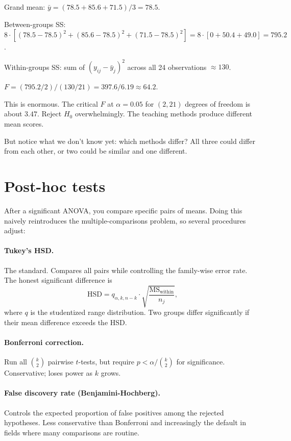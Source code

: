 Grand mean: $\bar y = (78.5 + 85.6 + 71.5)/3 = 78.5$.

Between-groups SS: $8 \cdot [(78.5 - 78.5)^2 + (85.6 - 78.5)^2 + (71.5 - 78.5)^2] = 8 \cdot [0 + 50.4 + 49.0] = 795.2$.

Within-groups SS: sum of $(y_{ij} - \bar y_j)^2$ across all 24 observations $\approx 130$.

$F = (795.2 / 2) / (130 / 21) = 397.6 / 6.19 \approx 64.2$.

This is enormous. The critical $F$ at $\alpha = 0.05$ for $(2, 21)$ degrees of freedom is about $3.47$. Reject $H_0$ overwhelmingly. The teaching methods produce different mean scores.

But notice what we don't know yet: which methods differ? All three could differ from each other, or two could be similar and one different.

\section{Post-hoc tests}

After a significant ANOVA, you compare specific pairs of means. Doing this naively reintroduces the multiple-comparisons problem, so several procedures adjust:

\paragraph{Tukey's HSD.} The standard. Compares all pairs while controlling the family-wise error rate. The honest significant difference is
\[
  \text{HSD} = q_{\alpha, k, n-k} \cdot \sqrt{\frac{\text{MS}_{\text{within}}}{n_j}},
\]
where $q$ is the studentized range distribution. Two groups differ significantly if their mean difference exceeds the HSD.

\paragraph{Bonferroni correction.} Run all $\binom{k}{2}$ pairwise $t$-tests, but require $p < \alpha / \binom{k}{2}$ for significance. Conservative; loses power as $k$ grows.

\paragraph{False discovery rate (Benjamini-Hochberg).} Controls the expected proportion of false positives among the rejected hypotheses. Less conservative than Bonferroni and increasingly the default in fields where many comparisons are routine.

